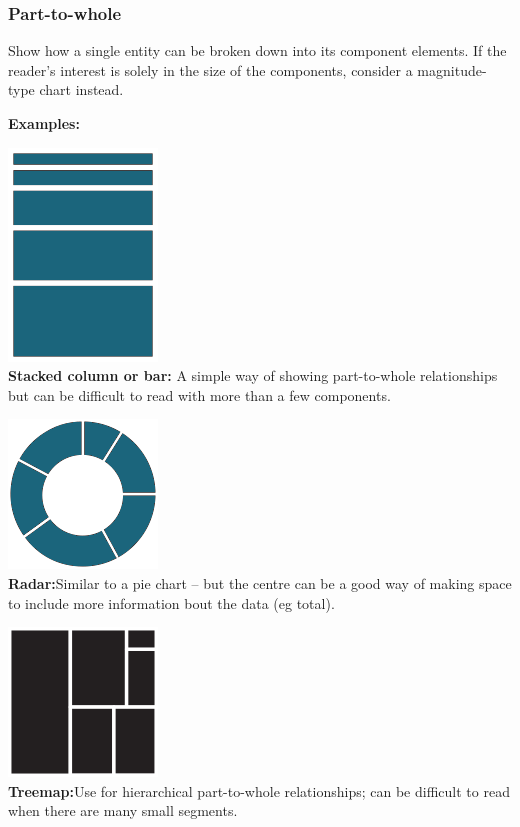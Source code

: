 \documentclass[
  a4paper,
  onecolumn,
  oneside]{book}
\begin{document}
\hypertarget{part-to-whole}{%
\subsubsection{Part-to-whole}\label{part-to-whole}}

Show how a single entity can be broken down into its component elements.
If the reader's interest is solely in the size of the components,
consider a magnitude-type chart instead.

\textbf{Examples:}

\includegraphics{part1/images/parttowhole1.png}\\
\textbf{Stacked column or bar:} A simple way of showing part-to-whole
relationships but can be difficult to read with more than a few
components.

\includegraphics{part1/images/parttowhole2.png}\\
\textbf{Radar:}Similar to a pie chart -- but the centre can be a good
way of making space to include more information bout the data (eg
total).

\includegraphics{part1/images/parttowhole3.png}\\
\textbf{Treemap:}Use for hierarchical part-to-whole relationships; can
be difficult to read when there are many small segments.
\end{document}
